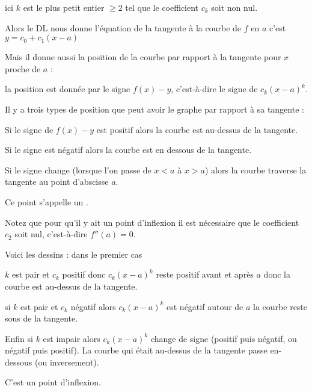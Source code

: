 ici $k$ est le plus petit entier $\ge2$ tel que le coefficient $c_k$ soit non nul.

\change

Alors le DL nous donne l'équation de la tangente à la courbe de $f$ en $a$ c'est  $y=c_0+c_1(x-a)$ 

\change

Mais il donne aussi 
la position de la courbe par rapport à la tangente pour $x$ proche de $a$ :

la position est donnée par le signe $f(x)-y$, c'est-à-dire le signe de $c_k(x-a)^k$.



Il y a trois types de position que peut avoir le graphe par rapport à sa tangente :

\change

Si le signe de $f(x)-y$ est positif alors la courbe est au-dessus de la tangente.

\change

  Si le signe est négatif alors la courbe est en dessous de la tangente. 

\change

Si le signe change (lorsque l'on passe de $x<a$ à $x>a$) alors la courbe traverse 
la tangente au point d'abscisse $a$. 

\change

Ce point s'appelle un .

\change

Notez que pour qu'il y ait un point d'inflexion 
il est nécessaire que le coefficient $c_2$ soit nul, c'est-à-dire $f''(a)=0$.


\diapo

Voici les dessins : dans le premier cas

$k$ est pair et $c_k$ positif donc $c_k (x-a)^k$ reste positif avant et après $a$ donc  la courbe est au-dessus de la tangente.

\change

si $k$ est pair et $c_k$ négatif alors $c_k (x-a)^k$ est négatif autour de $a$ la courbe reste sous de la tangente.

\change

Enfin si $k$ est impair alors $c_k (x-a)^k$ change de signe (positif puis négatif, ou négatif puis positif).
La courbe qui était au-dessus de la tangente passe en-dessous (ou inversement).

C'est un point d'inflexion.



